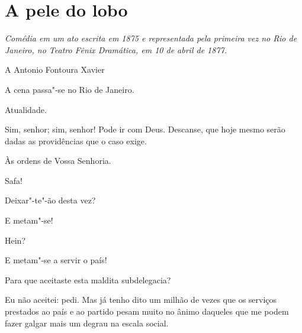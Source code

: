 \chapter{A pele do lobo}

\textit{Comédia em um ato escrita em 1875 e representada pela primeira vez no Rio de Janeiro, no
Teatro Fênix Dramática, em 10 de abril de 1877.}
\medskip

\hfill A Antonio Fontoura Xavier


\castpage










\vfil

A cena passa"-se no Rio de Janeiro.

Atualidade.
\pagebreak 



 

 Sim, senhor; sim, senhor! Pode ir com Deus. Descanse, que
hoje mesmo serão dadas as providências que o caso exige.

 Às ordens de Vossa Senhoria. 

 Safa!

   Deixar"-te"-ão desta vez?

 E metam"-se! 

  Hein?

 E metam"-se a servir o país!

 Para que aceitaste esta maldita subdelegacia?

  Eu não aceitei: pedi. Mas já tenho dito
um milhão de vezes que os serviços prestados ao país e ao partido pesam muito no
ânimo daqueles que me podem fazer galgar mais um degrau na
escala social.

